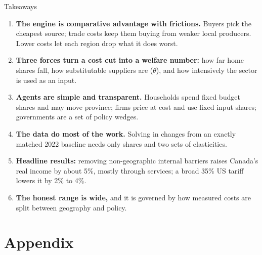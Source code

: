 \documentclass[aspectratio=169,9pt,t]{beamer}
\begin{document}
\begin{frame}{Takeaways}
  \begin{enumerate}
    \setlength{\itemsep}{0.7em}
    \item \textbf{The engine is comparative advantage with frictions.}
          Buyers pick the cheapest source; trade costs keep them buying
          from weaker local producers. Lower costs let each region drop
          what it does worst.
    \item \textbf{Three forces turn a cost cut into a welfare number:} how
          far home shares fall, how substitutable suppliers are
          ($\theta$), and how intensively the sector is used as an input.
    \item \textbf{Agents are simple and transparent.} Households spend
          fixed budget shares and may move province; firms price at cost
          and use fixed input shares; governments are a set of policy
          wedges.
    \item \textbf{The data do most of the work.} Solving in changes from
          an exactly matched 2022 baseline needs only shares and two sets
          of elasticities.
    \item \textbf{Headline results:} removing non-geographic internal
          barriers raises Canada's real income by about 5\%, mostly through
          services; a broad 35\% US tariff lowers it by 2\% to 4\%.
    \item \textbf{The honest range is wide,} and it is governed by how
          measured costs are split between geography and policy.
  \end{enumerate}
\end{frame}

\appendix
\section{Appendix}
\end{document}
